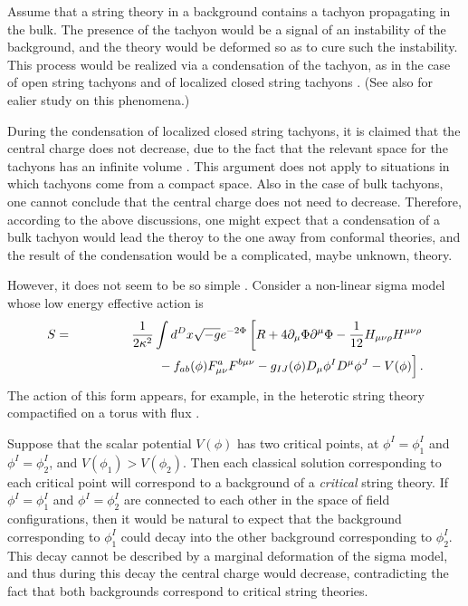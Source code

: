 \documentclass[a4paper,a4paper]{article}
\begin{document}
Assume that a string theory in a background contains a tachyon propagating in the bulk. 
The presence of the tachyon would be a signal of an instability of the background, and the theory 
would be deformed so as to cure such the instability. 
This process would be realized via a condensation of the tachyon, as in the case of open string tachyons 
\cite{open} and of localized closed string tachyons \cite{localized}. 
(See also \cite{70s} for ealier study on this phenomena.)

During the condensation of localized closed string tachyons, it is claimed that the central charge 
does not decrease, due to the fact that the relevant space for the tachyons has an infinite volume 
\cite{HKMM}. 
This argument does not apply to situations in which tachyons come from a compact space. 
Also in the case of bulk tachyons, one cannot conclude that the central charge does not need to 
decrease. 
Therefore, according to the above discussions, one might expect that a condensation of a bulk tachyon 
would lead the theroy to the one away from conformal theories, and the result of the condensation would be 
a complicated, maybe unknown, theory. 

\vspace{3mm}

However, it does not seem to be so simple \cite{suyama}. 
Consider a non-linear sigma model whose low energy effective action is 
\begin{eqnarray}
S &=& \frac1{2\kappa^2}\int d^Dx\sqrt{-g}e^{-2\Phi}\left[ R+4\partial_\mu\Phi\partial^\mu\Phi
     -\frac1{12}H_{\mu\nu\rho}H^{\mu\nu\rho}\right. \nonumber \\
  & & \hspace*{2cm}\left.\frac{ }{ }
     -f_{ab}(\phi)F^a_{\mu\nu}F^{b\mu\nu}-g_{IJ}(\phi)D_\mu\phi^I D^\mu\phi^J-V(\phi)\right]. 
          \label{gaugedSUGRA}
\end{eqnarray}
The action of this form appears, for example, in the heterotic string theory compactified on a torus with 
flux \cite{hetero}. 

Suppose that the scalar potential $V(\phi)$ has two critical points, at $\phi^I=\phi^I_1$ and 
$\phi^I=\phi^I_2$, and $V(\phi_1)>V(\phi_2)$. 
Then each classical solution corresponding to each critical point will correspond to a background of 
a {\it critical} string theory. 
If $\phi^I=\phi^I_1$ and $\phi^I=\phi^I_2$ are connected to each other in the space of field configurations, 
then it would be natural to expect 
that the background corresponding to $\phi^I_1$ could decay into the other background corresponding to 
$\phi^I_2$. 
This decay cannot be described by a marginal deformation of the sigma model, and thus during this decay the 
central charge would decrease, contradicting the fact that both backgrounds correspond to critical string 
theories. 
\end{document}
